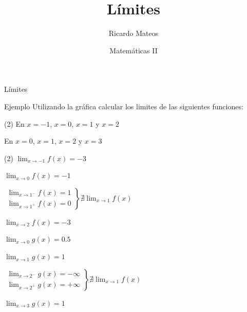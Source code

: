 \documentclass[8pt]{beamer}
\title{Límites}
\author{Ricardo Mateos}
\institute[UHEI-IVED]{Departamento de Matemáticas \\ UHEI - IVED}
\date{Matemáticas II}
\newcommand{\limite}[2]{\displaystyle \lim_{x \rightarrow #1}{#2}}
\begin{document}
\begin{frame}
\maketitle
\end{frame}

\begin{frame}
\tableofcontents
\end{frame}

\begin{frame}{Límites}
\begin{exampleblock}{Ejemplo}
Utilizando la gráfica calcular los limites de las siguientes funciones:
 \begin{tasks}[label=\alph*)](2)
\task 
En $x=-1$, $x=0$, $x=1$ y $x=2$

\task
En  $x=0$, $x=1$, $x=2$ y $x=3$

\end{tasks}
\end{exampleblock}

\begin{tasks}[label=\alph*)](2)
\task 
$\limite{-1}{f(x)}= -3$

$\limite{0}{f(x)}= -1$

$ \left. \begin{array}{l}
\limite{1^{-}}{f(x)} = 1 \\
\limite{1^{+}}{f(x)}= 0
\end{array} \right\rbrace  \nexists \limite{1}{f(x)}$

$\limite{2}{f(x)}=-3$

\task
$\limite{0}{g(x)}= 0.5$

$\limite{1}{g(x)}=1$

$ \left. \begin{array}{l}
\limite{2^{-}}{g(x)} = -\infty \\
\limite{2^{+}}{g(x)}= +\infty
\end{array} \right\rbrace  \nexists \limite{1}{f(x)}$

$\limite{3}{g(x)}=1$

\end{tasks}
\end{frame}
\end{document}
